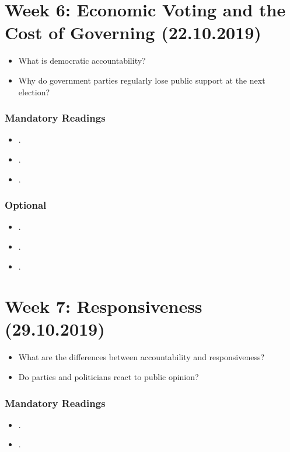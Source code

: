\documentclass[abstract=on,parskip=full,headings=standardclasses,fontsize=11pt,paper=a4]{scrartcl}
\begin{document}
\section{Week 6: Economic Voting and the Cost of Governing (22.10.2019)}


\begin{itemize}
\renewcommand\labelitemi{--}
\item What is democratic accountability?
\item Why do government parties  regularly lose public support at the next election?
\end{itemize}

\subsubsection*{Mandatory Readings}

\begin{itemize}
\item {}.
\item {}.
\item {}.
\end{itemize}


\subsubsection*{Optional}
\begin{itemize}
\item {}.
\item {}.
\item {}.
\end{itemize}

 

\section{Week 7:  Responsiveness (29.10.2019)}



\begin{itemize}
\renewcommand\labelitemi{--}
\item What are the differences between accountability and responsiveness?
\item Do parties and politicians react to public opinion? 
\end{itemize}

\subsubsection*{Mandatory Readings}
\begin{itemize}
\item {}.
\item {}.
\end{itemize}
\end{document}
